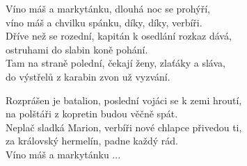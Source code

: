 
   
Víno máš a markytánku, dlouhá noc se prohýří,\\
víno máš a chvilku spánku, díky, díky, verbíři.\\

Dříve než se rozední, kapitán k osedlání rozkaz dává,\\
ostruhami do slabin koně pohání.\\
Tam na straně polední, čekají ženy, zlaťáky a sláva,\\
do výstřelů z karabin zvon už vyzvání.\\


Rozprášen je batalion, poslední vojáci se k zemi hroutí,\\
na polštáři z kopretin budou věčně spát.\\
Neplač sladká Marion, verbíři nové chlapce přivedou ti,\\
za královský hermelín, padne každý rád.\\

\chorus
Víno máš a markytánku ...

\newpage
